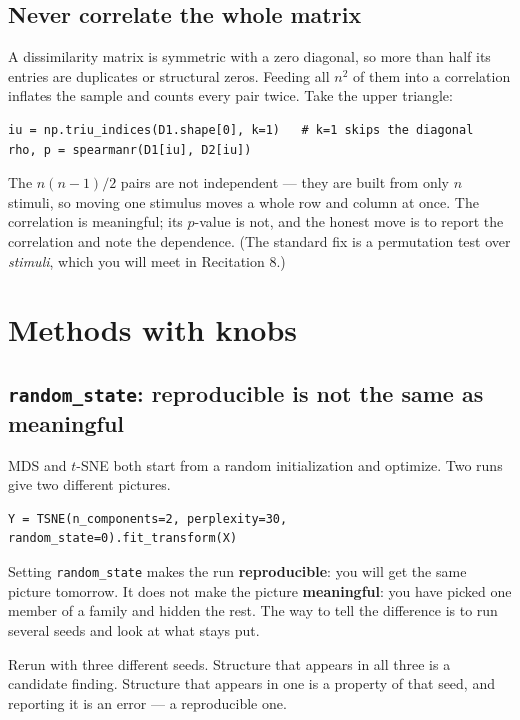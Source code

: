 \documentclass[11pt]{article}
\begin{document}
\subsection{Never correlate the whole matrix}

A dissimilarity matrix is symmetric with a zero diagonal, so more than half its
entries are duplicates or structural zeros. Feeding all $n^2$ of them into a
correlation inflates the sample and counts every pair twice. Take the upper
triangle:

\begin{lstlisting}
iu = np.triu_indices(D1.shape[0], k=1)   # k=1 skips the diagonal
rho, p = spearmanr(D1[iu], D2[iu])
\end{lstlisting}

\begin{keybox}
 The $n(n-1)/2$ pairs
are not independent --- they are built from only $n$ stimuli, so moving one
stimulus moves a whole row and column at once. The correlation is meaningful;
its $p$-value is not, and the honest move is to report the correlation and note
the dependence. (The standard fix is a permutation test over \emph{stimuli},
which you will meet in Recitation 8.)
\end{keybox}

\section{Methods with knobs}

\subsection{\texttt{random\_state}: reproducible is not the same as meaningful}

MDS and $t$-SNE both start from a random initialization and optimize. Two runs
give two different pictures.

\begin{lstlisting}
Y = TSNE(n_components=2, perplexity=30, random_state=0).fit_transform(X)
\end{lstlisting}

Setting \texttt{random\_state} makes the run \textbf{reproducible}: you will get
the same picture tomorrow. It does not make the picture \textbf{meaningful}: you
have picked one member of a family and hidden the rest. The way to tell the
difference is to run several seeds and look at what stays put.

\begin{keybox}
 Rerun with three different seeds. Structure that
appears in all three is a candidate finding. Structure that appears in one is a
property of that seed, and reporting it is an error --- a reproducible one.
\end{keybox}
\end{document}
